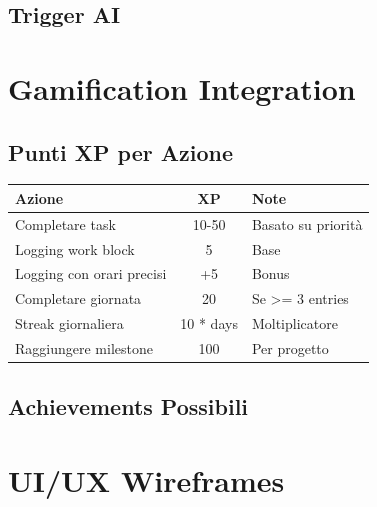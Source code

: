 \documentclass[11pt,a4paper]{article}
\begin{document}
\subsection{Trigger AI}


\newpage

\section{Gamification Integration}

\subsection{Punti XP per Azione}

\begin{center}
\begin{tabular}{|l|c|l|}
\hline
\textbf{Azione} & \textbf{XP} & \textbf{Note} \\
\hline
Completare task & 10-50 & Basato su priorità \\
Logging work block & 5 & Base \\
Logging con orari precisi & +5 & Bonus \\
Completare giornata & 20 & Se >= 3 entries \\
Streak giornaliera & 10 * days & Moltiplicatore \\
Raggiungere milestone & 100 & Per progetto \\
\hline
\end{tabular}
\end{center}

\subsection{Achievements Possibili}


\newpage

\section{UI/UX Wireframes}
\end{document}
